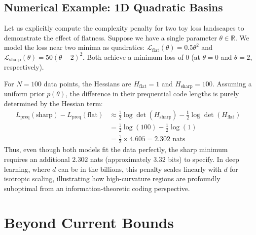 \subsection{Numerical Example: 1D Quadratic Basins}

Let us explicitly compute the complexity penalty for two toy loss landscapes to demonstrate the effect of flatness. Suppose we have a single parameter $\theta \in \mathbb{R}$. We model the loss near two minima as quadratics: $\mathcal{L}_{\text{flat}}(\theta) = 0.5 \theta^2$ and $\mathcal{L}_{\text{sharp}}(\theta) = 50 (\theta - 2)^2$. Both achieve a minimum loss of $0$ (at $\theta=0$ and $\theta=2$, respectively).

For $N=100$ data points, the Hessians are $H_{\text{flat}} = 1$ and $H_{\text{sharp}} = 100$. Assuming a uniform prior $p(\theta)$, the difference in their prequential code lengths is purely determined by the Hessian term:
\begin{align*}
    L_{\text{preq}}(\text{sharp}) - L_{\text{preq}}(\text{flat}) &\approx \frac{1}{2} \log \det (H_{\text{sharp}}) - \frac{1}{2} \log \det (H_{\text{flat}}) \\
    &= \frac{1}{2} \log(100) - \frac{1}{2} \log(1) \\
    &= \frac{1}{2} \times 4.605 = 2.302 \text{ nats}
\end{align*}
Thus, even though both models fit the data perfectly, the sharp minimum requires an additional $2.302$ nats (approximately $3.32$ bits) to specify. In deep learning, where $d$ can be in the billions, this penalty scales linearly with $d$ for isotropic scaling, illustrating how high-curvature regions are profoundly suboptimal from an information-theoretic coding perspective.

\section{Beyond Current Bounds}

